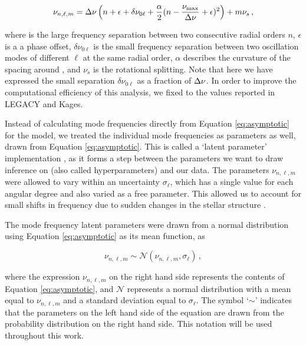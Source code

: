 \begin{equation}\label{eq:asymptotic}
	\nu_{n,\ell,m} = \mbox{$\Delta \nu$}\left(n + \epsilon + \delta\nu_{0\ell} + \frac{\alpha}{2}(n - \frac{\mbox{$\nu_{\rm max}$}}{\mbox{$\Delta \nu$}} + \epsilon)^2\right) + m\nu_{s}\, ,
\end{equation}

\noindent where \dnu is the large frequency separation between two consecutive radial orders $n$, $\epsilon$ is a a phase offset, $\delta\nu_{0\ell}$ is the small frequency separation between two oscillation modes of different $\ell$ at the same radial order, $\alpha$ describes the curvature of the spacing around \numax, and $\nu_s$ is the rotational splitting. Note that here we have expressed the small separation $\delta\nu_{0\ell}$ as a fraction of $\mbox{$\Delta \nu$}$. In order to improve the computational efficiency of this analysis, we fixed \dnu to the values reported in LEGACY and Kages.

Instead of calculating mode frequencies directly from Equation \ref{eq:asymptotic} for the model, we treated the individual mode frequencies as parameters as well, drawn from Equation \ref{eq:asymptotic}. This is called a `latent parameter' implementation \cite{hogg2012, hall+2019}, as it forms a step between the parameters we want to draw inference on (also called hyperparameters) and our data. 
The parameters $\nu_{n,\ell,m}$ were allowed to vary within an uncertainty $\sigma_{\ell}$, which has a single value for each angular degree and also varied as a free parameter.
This allowed us to account for small shifts in frequency due to sudden changes in the stellar structure \cite{mazumdar+2014}. 

The mode frequency latent parameters were drawn from a normal distribution using Equation \ref{eq:asymptotic} as its mean function, as

\begin{equation}
	\nu_{n, \ell, m} \sim \mathcal{N}(\nu_{n, \ell, m}, \sigma_{\ell})\, ,
\end{equation}

\noindent where the expression $\nu_{n, \ell, m}$ on the right hand side represents the contents of Equation \ref{eq:asymptotic}, and $\mathcal{N}$ represents a normal distribution with a mean equal to $\nu_{n, \ell, m}$ and a standard deviation equal to $\sigma_{\ell}$. The symbol `$\sim$' indicates that the parameters on the left hand side of the equation are drawn from the probability distribution on the right hand side. This notation will be used throughout this work.


